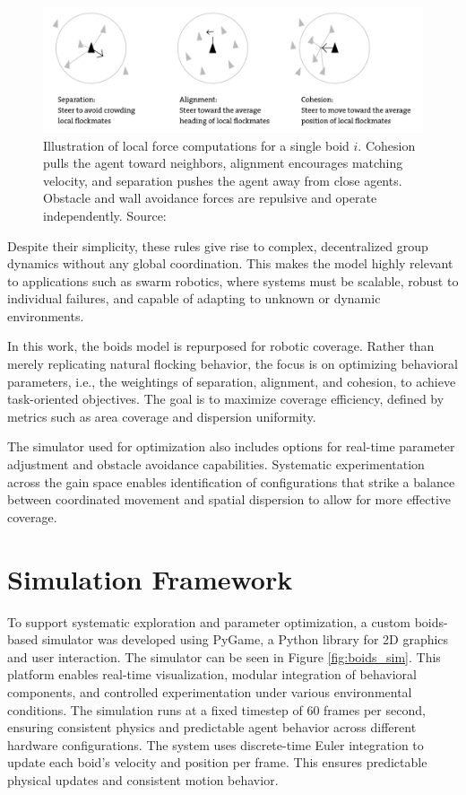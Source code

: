 \documentclass[12pt]{article}
\begin{document}
\begin{figure}[h!]
    \centering
    \includegraphics[width=0.7\linewidth]{force_diagram.png}
    \caption{Illustration of local force computations for a single boid \(i\). Cohesion pulls the agent toward neighbors, alignment encourages matching velocity, and separation pushes the agent away from close agents. Obstacle and wall avoidance forces are repulsive and operate independently. Source: \cite{martinez2023boids}}
    \label{fig:force_diagram}
  \end{figure}

Despite their simplicity, these rules give rise to complex, decentralized group dynamics without any global coordination. This makes the model highly relevant to applications such as swarm robotics, where systems must be scalable, robust to individual failures, and capable of adapting to unknown or dynamic environments.

In this work, the boids model is repurposed for robotic coverage. Rather than merely replicating natural flocking behavior, the focus is on optimizing behavioral parameters, i.e., the weightings of separation, alignment, and cohesion, to achieve task-oriented objectives. The goal is to maximize coverage efficiency, defined by metrics such as area coverage and dispersion uniformity.

The simulator used for optimization also includes options for real-time parameter adjustment and obstacle avoidance capabilities. Systematic experimentation across the gain space enables identification of configurations that strike a balance between coordinated movement and spatial dispersion to allow for more effective coverage.

\section{Simulation Framework}

To support systematic exploration and parameter optimization, a custom boids-based simulator was developed using PyGame, a Python library for 2D graphics and user interaction. The simulator can be seen in Figure \ref{fig:boids_sim}. This platform enables real-time visualization, modular integration of behavioral components, and controlled experimentation under various environmental conditions. The simulation runs at a fixed timestep of 60 frames per second, ensuring consistent physics and predictable agent behavior across different hardware configurations. The system uses discrete-time Euler integration to update each boid's velocity and position per frame. This ensures predictable physical updates and consistent motion behavior.
\end{document}
